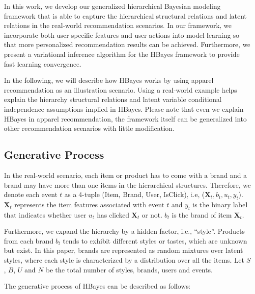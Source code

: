 In this work, we develop our generalized hierarchical Bayesian modeling framework that is able to capture the hierarchical structural relations and latent relations in the real-world recommendation scenarios. In our framework, we incorporate both user specific features and user actions into model learning so that more personalized recommendation results can be achieved. Furthermore, we present a variational inference algorithm for the HBayes framework to provide fast learning convergence.

In the following, we will describe how HBayes works by using apparel recommendation as an illustration scenario. Using a real-world example helps explain the hierarchy structural relations and latent variable conditional independence assumptions implied in HBayes. Please note that even we explain HBayes in apparel recommendation, the framework itself can be generalized into other recommendation scenarios with little modification. 



\subsection{Generative Process}

In the real-world scenario, each item or product has to come with a brand and a brand may have more than one items in the hierarchical structures. Therefore, we denote each event $t$ as a 4-tuple (Item, Brand, User, IsClick), i.e, ($\mathbf{X}_t, b_t, u_t, y_t$). $\mathbf{X}_t$ represents the item features associated with event $t$ and $y_t$ is the binary label that indicates whether user $u_t$ has clicked $\mathbf{X}_t$ or not. $b_t$ is the brand of item $\mathbf{X}_t$. 

Furthermore, we expand the hierarchy by a hidden factor, i.e., ``style''. Products from each brand $b_t$ tends to exhibit different styles or tastes, which are unknown but exist. In this paper, brands are represented as random mixtures over latent styles, where each style is characterized by a distribution over all the items. Let $S$, $B$, $U$ and $N$ be the total number of styles, brands, users and events.

The generative process of HBayes can be described as follows:

